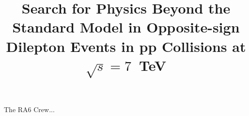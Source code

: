 \documentclass{cmspaper}
\begin{document}
     

\begin{titlepage}
    \pagestyle {plain}

  \title {Search for Physics Beyond the Standard Model in Opposite-sign Dilepton Events in pp Collisions at $\sqrt{s}=7$~TeV }
\begin{Authlist}
The RA6 Crew...
\end{Authlist}


\end{titlepage}



\newpage
\linenumbers












%





\appendix
%
\end{document}
